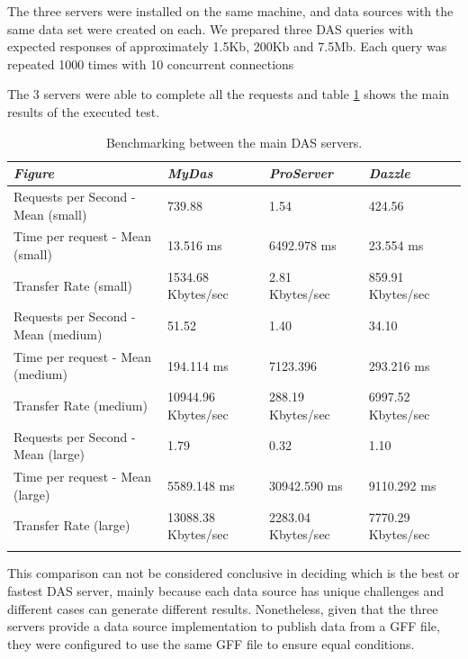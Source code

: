 The three servers were installed on the same machine, and data sources with the same data set were created on each. We prepared three DAS queries with expected responses of approximately 1.5Kb, 200Kb and 7.5Mb. Each query was repeated 1000 times with 10 concurrent connections

The 3 servers were able to complete all the requests and table \ref{tab:table2} shows the main results of the executed test.

\begin{table}[!ht]
        \begin{tabular}{| l | l | l | l |}
\hline \rowcolor{table_header}
\emph{Figure} & \emph{MyDas} & \emph{ProServer} & \emph{Dazzle}\\
\hline \rowcolor{row_odd}
Requests per Second - Mean (small) & 739.88 & 1.54 & 424.56\\
\hline \rowcolor{row_even}
Time per request - Mean (small) & 13.516 ms & 6492.978 ms & 23.554 ms\\
\hline \rowcolor{row_odd}
Transfer Rate (small) & 1534.68 Kbytes/sec & 2.81 Kbytes/sec & 859.91 Kbytes/sec\\
\hline \rowcolor{row_even}
Requests per Second - Mean (medium) & 51.52 & 1.40 & 34.10\\
\hline \rowcolor{row_odd}
Time per request - Mean (medium) & 194.114 ms & 7123.396 & 293.216 ms\\
\hline \rowcolor{row_even}
Transfer Rate (medium) & 10944.96 Kbytes/sec & 288.19 Kbytes/sec & 6997.52 Kbytes/sec\\
\hline \rowcolor{row_odd}
Requests per Second - Mean (large) & 1.79 & 0.32 & 1.10\\
\hline \rowcolor{row_even}
Time per request - Mean (large) & 5589.148 ms & 30942.590 ms & 9110.292 ms\\
\hline \rowcolor{row_odd}
Transfer Rate (large) & 13088.38 Kbytes/sec & 2283.04 Kbytes/sec & 7770.29 Kbytes/sec\\
\hline \rowcolor{row_even}
        \end{tabular}
        \caption{Benchmarking between the main DAS servers.}
        \label{tab:table2}
\end{table}

This comparison can not be considered conclusive in deciding which is the best or fastest DAS server, mainly because each data source has unique challenges and different cases can generate different results. Nonetheless, given that the three servers provide a data source implementation to publish data from a GFF file, they were configured to use the same GFF file to ensure equal conditions. 


